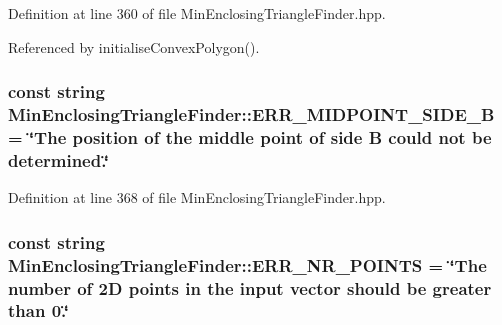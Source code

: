 \-Definition at line 360 of file \-Min\-Enclosing\-Triangle\-Finder.\-hpp.



\-Referenced by initialise\-Convex\-Polygon().

\hypertarget{classmultiscale_1_1MinEnclosingTriangleFinder_a39758a67f9d66d46f128f23fa7027d68}{
\subsubsection[{\-E\-R\-R\-\_\-\-M\-I\-D\-P\-O\-I\-N\-T\-\_\-\-S\-I\-D\-E\-\_\-\-B}]{\setlength{\rightskip}{0pt plus 5cm}const string {\bf \-Min\-Enclosing\-Triangle\-Finder\-::\-E\-R\-R\-\_\-\-M\-I\-D\-P\-O\-I\-N\-T\-\_\-\-S\-I\-D\-E\-\_\-\-B} = \char`\"{}\-The position of the middle point of side \-B could not be determined.\char`\"{}}}\label{classmultiscale_1_1MinEnclosingTriangleFinder_a39758a67f9d66d46f128f23fa7027d68}


\-Definition at line 368 of file \-Min\-Enclosing\-Triangle\-Finder.\-hpp.

\hypertarget{classmultiscale_1_1MinEnclosingTriangleFinder_af42f92155e17b69fc5b309dfcf160ad7}{
\subsubsection[{\-E\-R\-R\-\_\-\-N\-R\-\_\-\-P\-O\-I\-N\-T\-S}]{\setlength{\rightskip}{0pt plus 5cm}const string {\bf \-Min\-Enclosing\-Triangle\-Finder\-::\-E\-R\-R\-\_\-\-N\-R\-\_\-\-P\-O\-I\-N\-T\-S} = \char`\"{}\-The number of 2\-D points in the input vector should be greater than 0.\char`\"{}}}\label{classmultiscale_1_1MinEnclosingTriangleFinder_af42f92155e17b69fc5b309dfcf160ad7}


